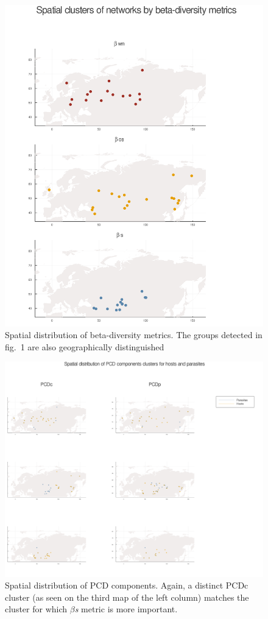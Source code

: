 \documentclass[11pt]{article}
\makeatletter
\def\maxwidth{\ifdim\Gin@nat@width>\linewidth\linewidth
\else\Gin@nat@width\fi}
\let\Oldincludegraphics\includegraphics
\renewcommand{\includegraphics}[1]{\Oldincludegraphics[width=\maxwidth]{#1}}
\makeatother
\begin{document}
\begin{figure}
\hypertarget{fig:threeA}{%
\centering
\includegraphics{figures/fig3A.png}
\caption{Spatial distribution of beta-diversity metrics. The groups
detected in fig.~1 are also geographically
distinguished}\label{fig:threeA}
}
\end{figure}

\begin{figure}
\hypertarget{fig:threeB}{%
\centering
\includegraphics{figures/fig3B.png}
\caption{Spatial distribution of PCD components. Again, a distinct PCDc
cluster (as seen on the third map of the left column) matches the
cluster for which \emph{\(\beta\)s} metric is more
important.}\label{fig:threeB}
}
\end{figure}
\end{document}
